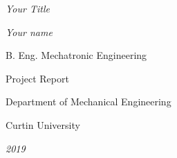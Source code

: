 \begin{titlepage}
	\begin{center}
		\vspace{0mm}
		
		\textit{Your Title}
		
		\vspace{30mm}
		
		\textit{Your name}
		
		\vfill
		
		B. Eng. Mechatronic Engineering
		
		Project Report
		
		Department of Mechanical Engineering
		
		Curtin University
		
		\textit{2019}
	\end{center}
\end{titlepage}